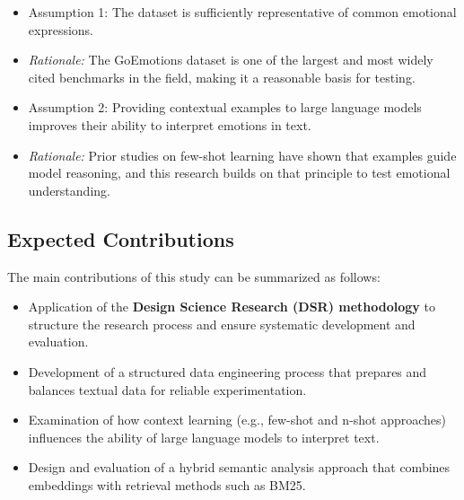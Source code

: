 \begin{itemize}
    \item Assumption 1: The dataset is sufficiently representative of common emotional expressions.  
    \item 
    \textit{Rationale:} The GoEmotions dataset is one of the largest and most widely cited benchmarks in the field, making it a reasonable basis for testing.  

    \item Assumption 2: Providing contextual examples to large language models improves their ability to interpret emotions in text.  
    \item 
    \textit{Rationale:} Prior studies on few-shot learning have shown that examples guide model reasoning, and this research builds on that principle to test emotional understanding.  
\end{itemize}

\subsection{Expected Contributions}
The main contributions of this study can be summarized as follows:
\begin{itemize}
    \item Application of the \textbf{Design Science Research (DSR) methodology} to structure the research process and ensure systematic development and evaluation.  
    \item Development of a structured data engineering process that prepares and balances textual data for reliable experimentation.  
    \item Examination of how context learning (e.g., few-shot and n-shot approaches) influences the ability of large language models to interpret text.  
    \item Design and evaluation of a hybrid semantic analysis approach that combines embeddings with retrieval methods such as BM25.  
\end{itemize}
\newpage


